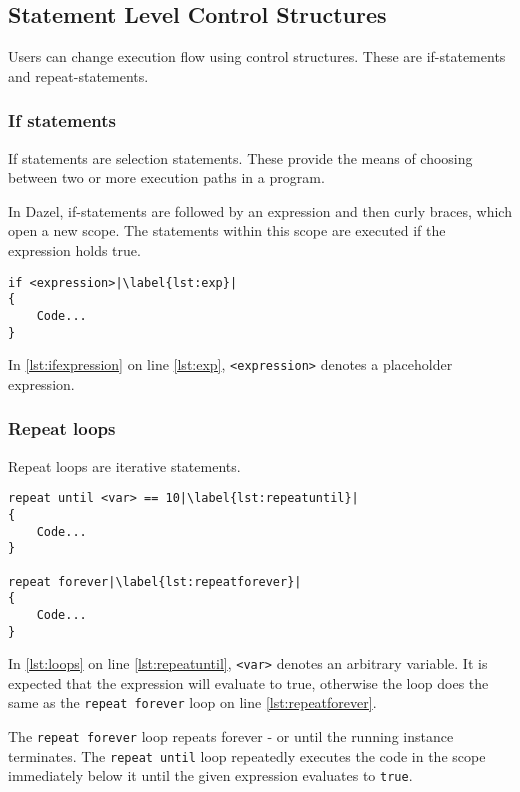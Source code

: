     
\subsection{Statement Level Control Structures}
Users can change execution flow using control structures. These are if-statements and repeat-statements.
\subsubsection{If statements}
If statements are selection statements. These provide the means of choosing between two or more execution paths in a program\cite{sebesta_concepts_2016}.

In Dazel, if-statements are followed by an expression and then curly braces, which open a new scope. The statements within this scope are executed if the expression holds true.

\begin{lstlisting}[caption={Example of an if statement}, label={lst:ifexpression},escapechar=|]
if <expression>|\label{lst:exp}|
{
    Code...
}
\end{lstlisting}

In \ref{lst:ifexpression} on line \ref{lst:exp},  \verb|<expression>| denotes a placeholder expression.

\subsubsection{Repeat loops}
Repeat loops are iterative statements.

\begin{lstlisting}[caption={Example of loops}, label={lst:loops},escapechar=|]
repeat until <var> == 10|\label{lst:repeatuntil}|
{
    Code...
}

repeat forever|\label{lst:repeatforever}|
{
    Code...
}
\end{lstlisting}

In \ref{lst:loops} on line \ref{lst:repeatuntil}, \verb|<var>| denotes an arbitrary variable. It is expected that the expression will evaluate to true, otherwise the loop does the same as the \verb|repeat forever| loop on line \ref{lst:repeatforever}.

The \verb|repeat forever| loop repeats forever - or until the running instance terminates.
The \verb|repeat until| loop repeatedly executes the code in the scope immediately below it until the given expression evaluates to \verb|true|.

